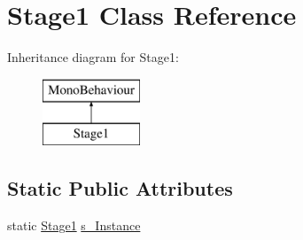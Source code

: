 \hypertarget{class_stage1}{}\section{Stage1 Class Reference}
\label{class_stage1}
Inheritance diagram for Stage1\+:\begin{figure}[H]
\begin{center}
\leavevmode
\includegraphics[height=2.000000cm]{class_stage1}
\end{center}
\end{figure}
\subsection*{Static Public Attributes}
\begin{DoxyCompactItemize}
\item 
static \mbox{\hyperlink{class_stage1}{Stage1}} \mbox{\hyperlink{class_stage1_ab20fb1804b3c34a0d5f0df630b79f48c}{s\+\_\+\+Instance}}
\end{DoxyCompactItemize}
